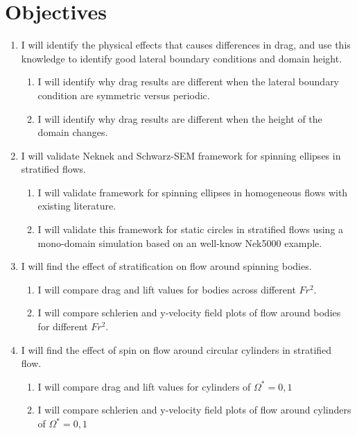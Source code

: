%
%
%
%

\chapter{Objectives}
\label{chp:Objectives}

\begin{enumerate}
	\item I will identify the physical effects that causes differences in drag, and use this knowledge to identify good lateral boundary conditions and domain height.
	\begin{enumerate}
		\item I will identify why drag results are different when the lateral boundary condition are symmetric versus periodic. 
		\item I will identify why drag results are different when the height of the domain changes. 
	\end{enumerate}
	\item I will validate Neknek and Schwarz-SEM framework for spinning ellipses in stratified flows.
	\begin{enumerate}
		\item I will validate framework for spinning ellipses in homogeneous flows with existing literature.
		\item I will validate this framework for static circles in stratified flows using a mono-domain simulation based on an well-know Nek5000 example.  		
	\end{enumerate}
	\item I will find the effect of stratification on flow around spinning bodies.
	\begin{enumerate}
		\item I will compare drag and lift values for bodies across different $Fr^2$.
		\item I will compare schlerien and y-velocity field plots of flow around bodies for different $Fr^2$.
	\end{enumerate}
	\item I will find the effect of spin on flow around circular cylinders in stratified flow.
	\begin{enumerate}
		\item I will compare drag and lift values for cylinders of $\Omega^{\ast} = 0, 1$ 
		\item I will compare schlerien and y-velocity field plots of flow around cylinders of $\Omega^{\ast} = 0, 1$ 
	\end{enumerate}
\end{enumerate}
